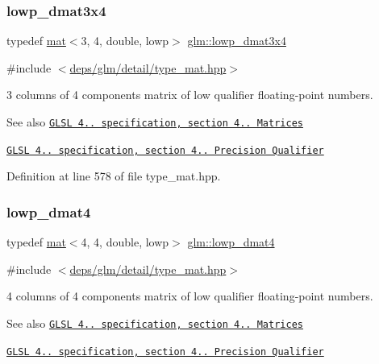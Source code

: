 \subsubsection{\texorpdfstring{lowp\+\_\+dmat3x4}{lowp\_dmat3x4}}
{\footnotesize\ttfamily typedef \hyperlink{structglm_1_1mat}{mat}$<$3, 4, double, lowp$>$ \hyperlink{group__core__precision_ga5a806e50b4cb26784620e98c8c03f03b}{glm\+::lowp\+\_\+dmat3x4}}



{\ttfamily \#include $<$\hyperlink{type__mat_8hpp}{deps/glm/detail/type\+\_\+mat.\+hpp}$>$}

3 columns of 4 components matrix of low qualifier floating-\/point numbers.

\begin{DoxySeeAlso}{See also}
\href{http://www.opengl.org/registry/doc/GLSLangSpec.4.20.8.pdf}{\tt G\+L\+SL 4.. specification, section 4.. Matrices} 

\href{http://www.opengl.org/registry/doc/GLSLangSpec.4.20.8.pdf}{\tt G\+L\+SL 4.. specification, section 4.. Precision Qualifier} 
\end{DoxySeeAlso}


Definition at line 578 of file type\+\_\+mat.\+hpp.

\mbox{\label{group__core__precision_ga608895f4a515c7ac6cf3a1c2f11e13cc}} 
\subsubsection{\texorpdfstring{lowp\+\_\+dmat4}{lowp\_dmat4}}
{\footnotesize\ttfamily typedef \hyperlink{structglm_1_1mat}{mat}$<$4, 4, double, lowp$>$ \hyperlink{group__core__precision_ga608895f4a515c7ac6cf3a1c2f11e13cc}{glm\+::lowp\+\_\+dmat4}}



{\ttfamily \#include $<$\hyperlink{type__mat_8hpp}{deps/glm/detail/type\+\_\+mat.\+hpp}$>$}

4 columns of 4 components matrix of low qualifier floating-\/point numbers.

\begin{DoxySeeAlso}{See also}
\href{http://www.opengl.org/registry/doc/GLSLangSpec.4.20.8.pdf}{\tt G\+L\+SL 4.. specification, section 4.. Matrices} 

\href{http://www.opengl.org/registry/doc/GLSLangSpec.4.20.8.pdf}{\tt G\+L\+SL 4.. specification, section 4.. Precision Qualifier} 
\end{DoxySeeAlso}


